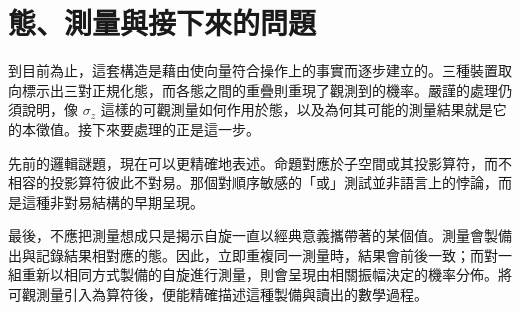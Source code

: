 \section{態、測量與接下來的問題}

到目前為止，這套構造是藉由使向量符合操作上的事實而逐步建立的。三種裝置取向標示出三對正規化態，而各態之間的重疊則重現了觀測到的機率。嚴謹的處理仍須說明，像 \(\sigma_z\) 這樣的可觀測量如何作用於態，以及為何其可能的測量結果就是它的本徵值。接下來要處理的正是這一步。

先前的邏輯謎題，現在可以更精確地表述。命題對應於子空間或其投影算符，而不相容的投影算符彼此不對易。那個對順序敏感的「或」測試並非語言上的悖論，而是這種非對易結構的早期呈現。

\begin{classroomqa}
\end{classroomqa}

\begin{classroomqa}
\end{classroomqa}

最後，不應把測量想成只是揭示自旋一直以經典意義攜帶著的某個值。測量會製備出與記錄結果相對應的態。因此，立即重複同一測量時，結果會前後一致；而對一組重新以相同方式製備的自旋進行測量，則會呈現由相關振幅決定的機率分佈。將可觀測量引入為算符後，便能精確描述這種製備與讀出的數學過程。